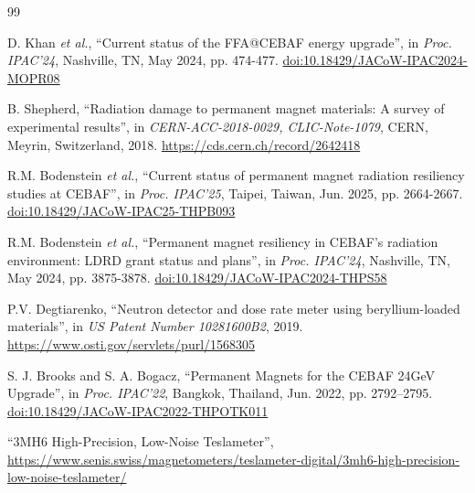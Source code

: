 \documentclass[a4paper,
               ]{jacow}
\begin{document}
%
%
%
	{\printbibliography}%
	{%
	
	\begin{thebibliography}{99}   %

            D. Khan \emph{et al.},
            ``Current status of the FFA@CEBAF energy upgrade'',
            in \emph{Proc. IPAC'24}, Nashville, TN, May 2024, pp. 474-477.
            \url{doi:10.18429/JACoW-IPAC2024-MOPR08}

           B. Shepherd,
           \textquotedblleft{Radiation damage to permanent magnet materials: A survey of experimental results}\textquotedblright,
           in \emph{CERN-ACC-2018-0029, CLIC-Note-1079}, CERN, Meyrin, Switzerland, 2018.
           \url{https://cds.cern.ch/record/2642418}

             R.M. Bodenstein \emph{et al.},
            ``Current status of permanent magnet radiation resiliency studies at CEBAF'',
            in \emph{Proc. IPAC'25}, Taipei, Taiwan, Jun. 2025, pp. 2664-2667.
            \url{doi:10.18429/JACoW-IPAC25-THPB093}
       
            R.M. Bodenstein \emph{et al.},
            ``Permanent magnet resiliency in CEBAF’s radiation environment: LDRD grant status and plans'',
            in \emph{Proc. IPAC'24}, Nashville, TN, May 2024, pp. 3875-3878.
            \url{doi:10.18429/JACoW-IPAC2024-THPS58}

           P.V. Degtiarenko,
           \textquotedblleft{Neutron detector and dose rate meter using beryllium-loaded materials}\textquotedblright,
           in \emph{US Patent Number 10281600B2}, 2019.
           \url{https://www.osti.gov/servlets/purl/1568305}

           S. J. Brooks and S. A. Bogacz,
           \textquotedblleft{Permanent Magnets for the CEBAF 24GeV Upgrade}\textquotedblright,
           in \emph{Proc. IPAC’22}, Bangkok, Thailand, Jun. 2022, pp. 2792--2795.
           \url{doi:10.18429/JACoW-IPAC2022-THPOTK011}

            \textquotedblleft{3MH6 High-Precision, Low-Noise Teslameter}\textquotedblright, \url{https://www.senis.swiss/magnetometers/teslameter-digital/3mh6-high-precision-low-noise-teslameter/}


\end{thebibliography}}
\end{document}

